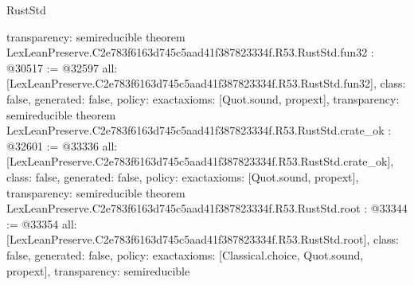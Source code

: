 \begin{lexlean}{RustStd}
\begin{coremodule}
{  transparency: semireducible
}
theorem LexLeanPreserve.C2e783f6163d745c5aad41f387823334f.R53.RustStd.fun32 : @30517 := @32597 {
  all: [LexLeanPreserve.C2e783f6163d745c5aad41f387823334f.R53.RustStd.fun32],
  class: false,
  generated: false,
  policy: exact{axioms: [Quot.sound, propext]},
  transparency: semireducible
}
theorem LexLeanPreserve.C2e783f6163d745c5aad41f387823334f.R53.RustStd.crate_ok : @32601 := @33336 {
  all: [LexLeanPreserve.C2e783f6163d745c5aad41f387823334f.R53.RustStd.crate_ok],
  class: false,
  generated: false,
  policy: exact{axioms: [Quot.sound, propext]},
  transparency: semireducible
}
theorem LexLeanPreserve.C2e783f6163d745c5aad41f387823334f.R53.RustStd.root : @33344 := @33354 {
  all: [LexLeanPreserve.C2e783f6163d745c5aad41f387823334f.R53.RustStd.root],
  class: false,
  generated: false,
  policy: exact{axioms: [Classical.choice, Quot.sound, propext]},
  transparency: semireducible
}


\end{coremodule}
\end{lexlean}
